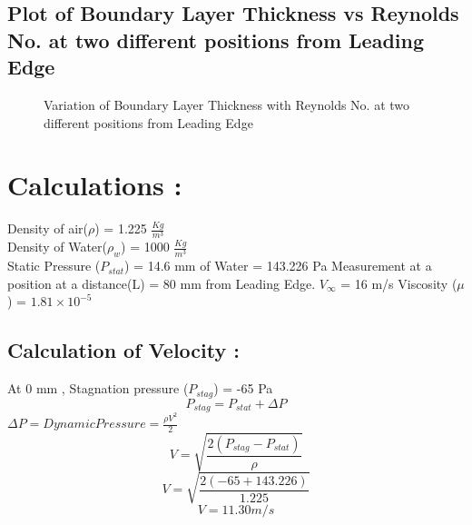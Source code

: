 \documentclass[12pt,a4paper]{article}
\begin{document}
\subsection{Plot of Boundary Layer Thickness vs Reynolds No. at two different positions from Leading Edge}
\begin{figure}[!ht]
	\begin{center}
	\end{center}
	\caption{Variation of Boundary Layer Thickness with Reynolds No. at two different positions from Leading Edge}
\end{figure}


\section{Calculations :}
Density of air($\rho$) = 1.225 $\frac{Kg}{m^3}$ \\
Density of Water($\rho_w$) = 1000 $\frac{Kg}{m^3}$ \\
Static Pressure ($P_{stat}$) = 14.6 mm of Water = 143.226 Pa
Measurement at a position at a distance(L) = 80 mm from Leading Edge.
$V_{\infty}$ = 16 m/s
Viscosity ($\mu$) = $1.81 \times 10^{-5}$

\subsection{Calculation of Velocity :}
At 0 mm ,
Stagnation pressure ($P_{stag}$) = -65 Pa \\

$$ P_{stag} = P_{stat} + \Delta P $$ 
$\Delta P = Dynamic Pressure = \frac{\rho V^2}{2}$ \\
$$ V = \sqrt{\frac{2(P_{stag}-P_{stat})}{\rho}} $$
$$ V = \sqrt{\frac{2(-65+143.226)}{1.225}} $$
$$ V = 11.30 m/s $$
\end{document}
